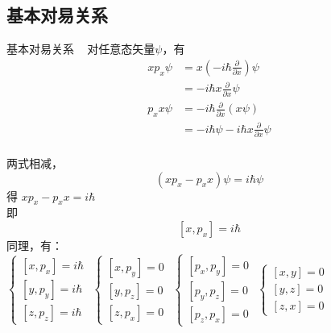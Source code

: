 \subsection{基本对易关系}

\begin{frame}{基本对易关系}
    \解~ 对任意态矢量$\psi$，有
    \begin{equation*}
        \begin{split}
        xp_x\psi&= x(-i\hbar \frac{\partial}{\partial x})\psi \\
        &=-i\hbar x \frac{\partial}{\partial x}\psi\\
        p_x x \psi&= -i\hbar \frac{\partial}{\partial x} (x\psi) \\
        &=-i\hbar\psi - i\hbar x \frac{\partial}{\partial x}\psi \\
        \end{split}  
    \end{equation*}
\end{frame} 

\begin{frame}
    两式相减，$$(xp_x-p_x x)\psi= i\hbar\psi$$
    得 $xp_x-p_x x= i\hbar$ \\ \vspace{0.3em}
    即 $$\boxed{[x,p_x]= i\hbar}$$
    同理，有：\\
    $\begin{cases}
        [x,p_x]= i\hbar  \\ 
        [y,p_y]= i\hbar  \\ 
        [z,p_z]= i\hbar  
    \end{cases}$
    $\begin{cases}
        [x,p_y]= 0  \\ 
        [y,p_z]= 0  \\ 
        [z,p_x]= 0  
    \end{cases}$
    $\begin{cases}
        [p_x,p_y]= 0  \\ 
        [p_y,p_z]= 0  \\ 
        [p_z,p_x]= 0  
    \end{cases}$
    $\begin{cases}
        [x,y]= 0  \\ 
        [y,z]= 0  \\ 
        [z,x]= 0  
    \end{cases}$ \\
\end{frame} 

